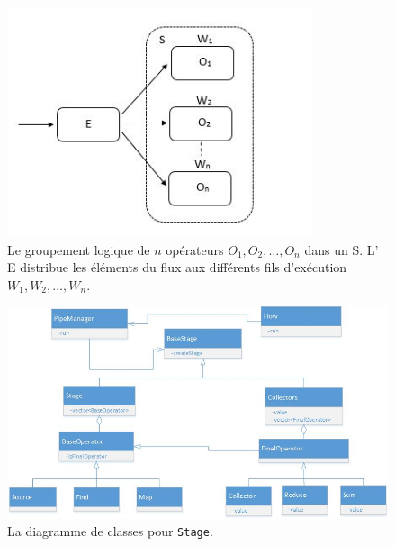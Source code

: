 \begin{figure}[ht]
\centering
     \includegraphics[width=0.8\textwidth]{Figures/Stages.jpg}
      \caption[Le groupement logique de $n$ op\'erateurs $O_1, O_2, \ldots, O_n$ dans un  S.]{Le groupement logique de $n$ op\'erateurs $O_1, O_2, \ldots, O_n$ dans un  S.  L' E distribue les \'el\'ements du flux aux diff\'erents fils d'ex\'ecution $W_1, W_2, \ldots, W_n$.}
       \label{Stages.fig}
\end{figure}

\begin{figure}[ht]
\centering
     \includegraphics[width=1.0\textwidth]{Figures/StagesClassDiagramme.jpg}
      \caption{La diagramme de classes pour \texttt{Stage}.}
       \label{StagesClassDiagramme.fig}
\end{figure}



